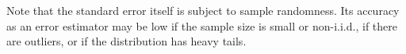 \begin{Description}
Note that the standard error itself is subject to sample randomness.
Its accuracy as an error estimator may be low if the sample size is small
or \mbox{non-i.i.d.}, if there are outliers, or if the distribution has
heavy tails.
\end{Description}


